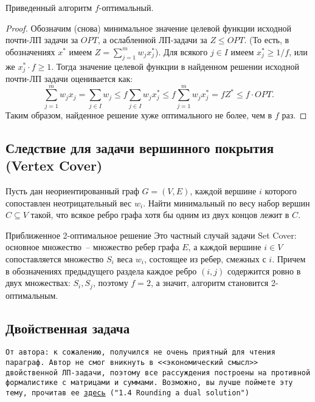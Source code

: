 \begin{theorem*}
    Приведенный алгоритм $f$-оптимальный.
\end{theorem*}
\begin{proof}
    Обозначим (снова) минимальное значение целевой функции исходной почти-ЛП задачи за $OPT$, а ослабленной ЛП-задачи за $Z \leq OPT$.  (То есть, в обозначениях $x^*$ имеем $Z = \sum\limits_{j=1}^m w_j x_j^*$). Для всякого $j\in I$ имеем $x_j^* \geq 1/f$, или же $x_j^*\cdot f \geq 1$. Тогда значение целевой функции в найденном решении исходной почти-ЛП задачи оценивается как:
    $$\sum_{j=1}^m w_j x_j = \sum_{j \in I} w_j \leq f \sum_{j \in I} w_j x_j^* \leq f \sum_{j=1}^m w_j x_j^* = f Z^* \leq f \cdot OPT.$$ Таким образом, найденное решение хуже оптимального не более, чем в $f$ раз.
\end{proof}

\subsection{Следствие для задачи вершинного покрытия (Vertex Cover)}
\begin{problem*}
	Пусть дан неориентированный граф $G = (V, E)$, каждой вершине $i$ которого сопоставлен неотрицательный вес $w_i$. Найти минимальный по весу набор вершин $C \subseteq V$ такой, что всякое ребро графа хотя бы одним из двух концов лежит в $C$.
\end{problem*}
\begin{algodescription}{Приближенное 2-оптимальное решение} Это частный случай задачи Set Cover: основное множество~-- множество ребер графа $E$, а каждой вершине $i \in V$ сопоставляется множество $S_i$ веса $w_i$, состоящее из ребер, смежных с $i$. Причем в обозначениях предыдущего раздела каждое ребро $(i, j)$ содержится ровно в двух множествах: $S_i, S_j$, поэтому $f = 2$, а значит, алгоритм становится 2-оптимальным.
\end{algodescription}

\subsection{Двойственная задача}
\texttt{От автора: к сожалению, получился не очень приятный для чтения параграф. Автор не смог вникнуть в <<экономический смысл>> двойственной ЛП-задачи, поэтому все рассуждения построены на противной формалистике с матрицами и суммами. Возможно, вы лучше поймете эту тему, прочитав ее
\texttt{\href{https://www.designofapproxalgs.com/book.pdf}{\underline{здесь}}}
("1.4 Rounding a dual solution")
}

